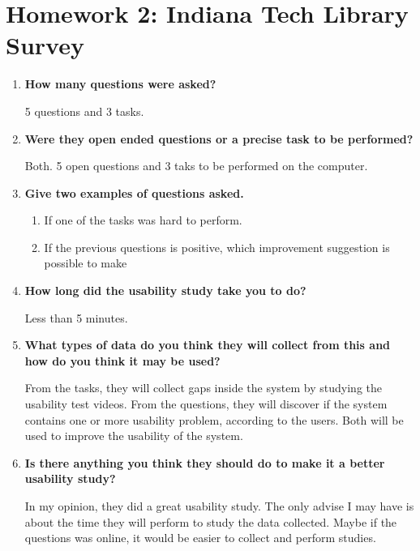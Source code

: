\chapter{Homework 2: Indiana Tech Library Survey}
	\begin{enumerate}
		\item{\textbf{How many questions were asked?}

			5 questions and 3 tasks.}
		\item{\textbf{Were they open ended questions or a precise task to be performed?}

			Both. 5 open questions and 3 taks to be performed on the computer.}
		\item{\textbf{Give two examples of questions asked.}

		\begin{enumerate}
			\item{If one of the tasks was hard to perform.}
			\item{If the previous questions is positive, which improvement suggestion is possible to make}
		\end{enumerate}}
		\item{\textbf{How long did the usability study take you to do?}

			Less than 5 minutes.}
		\item{\textbf{What types of data do you think they will collect from this and how do you think it may be used?}

			From the tasks, they will collect gaps inside the system by studying the usability test videos. From the questions, they will discover if the system contains one or more usability problem, according to the users. Both will be used to improve the usability of the system.}
		\item{\textbf{Is there anything you think they should do to make it a better usability study?}

			In my opinion, they did a great usability study. The only advise I may have is about the time they will perform to study the data collected. Maybe if the questions was online, it would be easier to collect and perform studies.}
	\end{enumerate}
